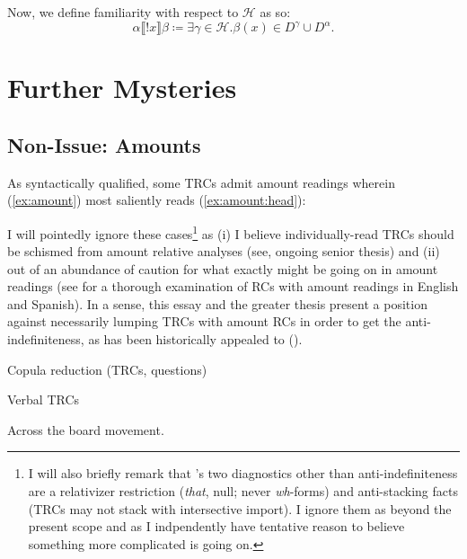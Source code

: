 \documentclass[11pt]{article}
\begin{document}
Now, we define familiarity with respect to \(\mathcal{H}\) as so:
\[\alpha\llbracket!x\rrbracket\beta \coloneqq \exists \gamma \in \mathcal{H} . \beta(x) \in D^\gamma \cup D^\alpha.\]


\section{Further Mysteries}\label{sec:mysteries}
\subsection{Non-Issue: Amounts}
As syntactically qualified, some TRCs admit amount readings wherein (\ref{ex:amount}) most saliently reads (\ref{ex:amount:head}):

\begin{exe}
	\label{ex:amount}
	\label{ex:amount:head}
\end{exe}

I will pointedly ignore these cases\footnote{I will also briefly remark that \citet{carlsonAmountRelatives1977}'s two diagnostics other than anti-indefiniteness are a relativizer restriction (\textit{that}, null; never \textit{wh}-forms) and anti-stacking facts (TRCs may not stack with intersective import). I ignore them as beyond the present scope and as I indpendently have tentative reason to believe something more complicated is going on.} as (i) I believe individually-read TRCs should be schismed from amount relative analyses (see, ongoing senior thesis) and (ii) out of an abundance of caution for what exactly might be going on in amount readings (see \cite{mendiaAmountRelativesRedux2017} for a thorough examination of RCs with amount readings in English and Spanish). In a sense, this essay and the greater thesis present a position against necessarily lumping TRCs with amount RCs in order to get the anti-indefiniteness, as has been historically appealed to (\cite{carlsonAmountRelatives1977, heimWhereDoesDefiniteness1987, grosuStrangeRelativesThird1998, grosuAmountRelatives2017}).



Copula reduction (TRCs, questions)

Verbal TRCs

Across the board movement.

\begin{raggedright}
	\printbibliography
\end{raggedright}
\end{document}
